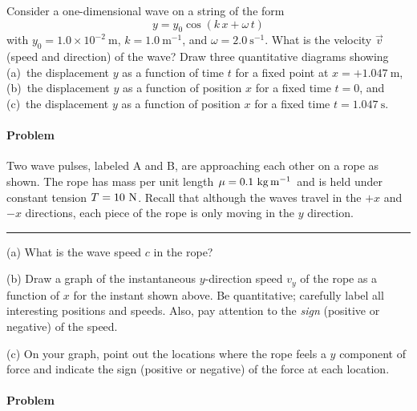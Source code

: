 \documentclass[12pt]{article}
\newcounter{problem}
\begin{document}
Consider a one-dimensional wave on a string of the form
\begin{equation}
y = y_0 \cos(k\,x + \omega\,t)
\end{equation}
with $y_0= 1.0\times 10^{-2}~\mathrm{m}$, $k= 1.0~\mathrm{m^{-1}}$,
and $\omega= 2.0~\mathrm{s^{-1}}$.  What is the velocity $\vec{v}$
(speed and direction) of the wave?  Draw three quantitative diagrams
showing (a)~the displacement $y$ as a function of time $t$ for a fixed
point at $x= +1.047~\mathrm{m}$, (b)~the displacement $y$ as a
function of position $x$ for a fixed time $t=0$, and (c)~the
displacement $y$ as a function of position $x$ for a fixed time $t=
1.047~\mathrm{s}$.

\paragraph{Problem~\theproblem}

Two wave pulses, labeled A and B, are approaching each other on a rope
as shown.  The rope has mass per unit length $\mu= 0.1~{\rm
kg\,m^{-1}}$ and is held under constant tension $T= 10~{\rm N}$.
Recall that although the waves travel in the $+x$ and $-x$ directions,
each piece of the rope is only moving in the $y$ direction.
\\ \rule{0.1\textwidth}{0pt}

(a) What is the wave speed $c$ in the rope?

(b) Draw a graph of the instantaneous $y$-direction speed $v_y$ of the
rope as a function of $x$ for the instant shown above.  Be
quantitative; carefully label all interesting positions and speeds.
Also, pay attention to the {\em sign} (positive or negative) of the
speed.

(c) On your graph, point out the locations where the rope feels a $y$
component of force and indicate the sign (positive or negative) of the
force at each location.

\paragraph{Problem~\theproblem}
\end{document}
